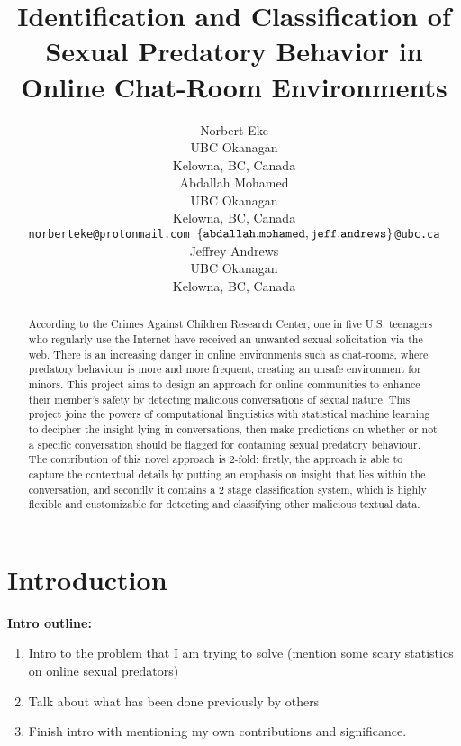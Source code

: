\documentclass[11pt]{article}
\title{Identification and Classification of Sexual Predatory Behavior in Online Chat-Room Environments}
\author{Norbert Eke \\
  UBC Okanagan \\
  Kelowna, BC, Canada \\
 \And
  Abdallah Mohamed \\
  UBC Okanagan \\
  Kelowna, BC, Canada \\
  {\tt norberteke@protonmail.com \tab  $\left\{\tt abdallah.mohamed, jeff.andrews \right\}$\tt @ubc.ca} \\
  \And
  Jeffrey Andrews \\
  UBC Okanagan \\
  Kelowna, BC, Canada \\
 }
\date{}
\begin{document}
\maketitle

\begin{abstract} According to the Crimes Against Children Research Center, one in five U.S. teenagers who regularly use the Internet have received an unwanted sexual solicitation via the web. There is an increasing danger in online environments such as chat-rooms, where predatory behaviour is more and more frequent, creating an unsafe environment for minors. 
This project aims to design an approach for online communities to enhance their member’s safety by detecting malicious conversations of sexual nature. This project joins the powers of computational linguistics with statistical machine learning to decipher the insight lying in conversations, then make predictions on whether or not a specific conversation should be flagged for containing sexual predatory behaviour. 
The contribution of this novel approach is 2-fold: firstly, the approach is able to capture the contextual details by putting an emphasis on insight that lies within the conversation, and secondly it contains a 2 stage classification system, which is highly flexible and customizable for detecting and classifying other malicious textual data. 
\end{abstract}

\section{Introduction}
\textbf{Intro outline:}
\begin{enumerate}
    \item Intro to the problem that I am trying to solve (mention some scary statistics on online sexual predators)
    \item Talk about what has been done previously by others
    \item Finish intro with mentioning my own contributions and significance.
\end{enumerate}
\end{document}
